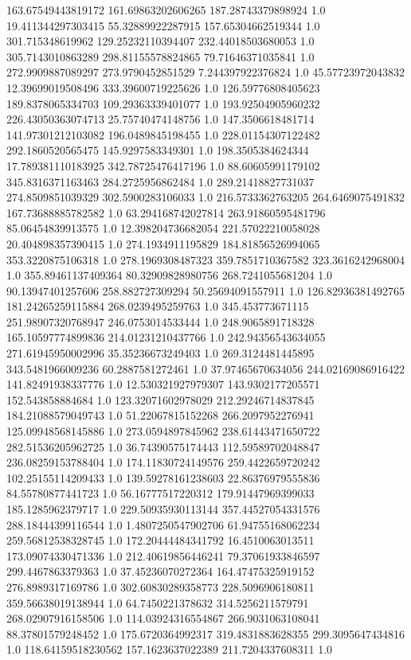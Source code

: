 163.67549443819172	161.69863202606265	187.28743379898924	1.0
19.411344297303415	55.32889922287915	157.65304662519344	1.0
301.715348619962	129.25232110394407	232.44018503680053	1.0
305.7143010863289	298.81155578824865	79.71646371035841	1.0
272.9909887089297	273.9790452851529	7.244397922376824	1.0
45.57723972043832	12.39699019508496	333.39600719225626	1.0
126.59776808405623	189.8378065334703	109.29363339401077	1.0
193.92504905960232	226.43050363074713	25.75740474148756	1.0
147.3506618481714	141.97301212103082	196.0489845198455	1.0
228.01154307122482	292.1860520565475	145.9297583349301	1.0
198.3505384624344	17.789381110183925	342.78725476417196	1.0
88.60605991179102	345.8316371163463	284.2725956862484	1.0
289.21418827731037	274.8509851039329	302.5900283106033	1.0
216.5733362763205	264.6469075491832	167.73688885782582	1.0
63.294168742027814	263.91860595481796	85.06454839913575	1.0
12.398204736682054	221.57022210058028	20.404898357390415	1.0
274.1934911195829	184.81856526994065	353.3220875106318	1.0
278.1969308487323	359.7851710367582	323.3616242968004	1.0
355.89461137409364	80.32909828980756	268.7241055681204	1.0
90.13947401257606	258.882727309294	50.25694091557911	1.0
126.82936381492765	181.24265259115884	268.0239495259763	1.0
345.453773671115	251.98907320768947	246.0753014533444	1.0
248.9065891718328	165.10597774899836	214.01231210437766	1.0
242.94356543634055	271.61945950002996	35.35236673249403	1.0
269.3124481445895	343.5481966009236	60.2887581272461	1.0
37.97465670634056	244.02169086916422	141.82491938337776	1.0
12.530321927979307	143.9302177205571	152.543858884684	1.0
123.32071602978029	212.29246714837845	184.21088579049743	1.0
51.22067815152268	266.2097952276941	125.09948568145886	1.0
273.0594897845962	238.61443471650722	282.51536205962725	1.0
36.74390575174443	112.59589702048847	236.08259153788404	1.0
174.11830724149576	259.4422659720242	102.25155114209433	1.0
139.59278161238603	22.86376979555836	84.55780877441723	1.0
56.16777517220312	179.91447969399033	185.1285962379717	1.0
229.50935930113144	357.44527054331576	288.18444399116544	1.0
1.4807250547902706	61.94755168062234	259.56812538328745	1.0
172.20444484341792	16.4510063013511	173.09074330471336	1.0
212.40619856446241	79.37061933846597	299.4467863379363	1.0
37.45236070272364	164.47475325919152	276.8989317169786	1.0
302.60830289358773	228.5096906180811	359.56638019138944	1.0
64.7450221378632	314.5256211579791	268.02907916158506	1.0
114.03924316554867	266.9031063108041	88.37801579248452	1.0
175.6720364992317	319.4831883628355	299.3095647434816	1.0
118.64159518230562	157.1623637022389	211.7204337608311	1.0
